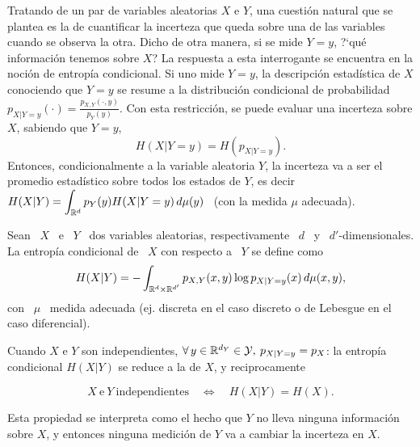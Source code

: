 \label{Sec:SZ:Mutua}

Tratando de un par de variables aleatorias $X$ e $Y$, una cuesti\'on natural que
se  plantea es  la  de cuantificar  la  incerteza  que queda  sobre  una de  las
variables cuando se observa la otra.  Dicho de  otra manera, si se mide $Y = y$,
?`qu\'e informaci\'on  tenemos sobre  $X$? La respuesta  a esta  interrogante se
encuentra en  la noci\'on de  entrop\'ia condicional.  Si uno  mide $Y =  y$, la
descripci\'on  estad\'istica de  $X$  conociendo que  $Y  = y$  se  resume a  la
distribuci\'on      condicional      de      probabilidad      $p_{X|Y=y}(\cdot)
= \frac{p_{X,Y}(\cdot,y)}{p_Y(y)}$.   Con esta  restricci\'on, se  puede evaluar
una incerteza sobre $X$, sabiendo que $Y=y$,
%
\[
H(X|Y=y) = H\left( p_{X|Y=y} \right).
\]
%
Entonces, condicionalmente a la variable aleatoria $Y$, la incerteza va a ser el
promedio estad\'istico sobre  todos los estados de $Y$,  es decir $\displaystyle
H(X|Y)  = \int_{\mathbb{R}^d}  p_Y(y) H(X|Y=y)  \, d\mu(y)$  \ (con  la medida  $\mu$
adecuada).
%
\begin{definicion}
\label{Def:SZ:entropiacondicional}
%
  Sean \ $X$ \  e \ $Y$ \ dos variables aleatorias, respectivamente  \ $d$ \ y \
  $d'$-dimensionales. La entrop\'ia condicional de \ $X$ con respecto a \ $Y$ se
  define como
  \[
  H(X|Y)   =   -  \int_{\mathbb{R}^d   \times   \mathbb{R}^{d'}}  p_{X,Y}(x,y)   \log
  p_{X|Y=y}(x) \, d\mu(x,y),
  \]
  con \ $\mu$ \ medida adecuada (ej.  discreta en el caso discreto o de Lebesgue
  en el caso diferencial).
\end{definicion}

Cuando $X$ e  $Y$ son independientes, $\forall  \, y \in \mathbb{R}^{d_Y}  \in \mathcal{Y}, \:
p_{X|Y=y} = p_X$:  la entrop\'ia condicional $H(X|Y)$  se reduce a la  de $X$, y
reciprocamente
%
\begin{propiedades}
\item\label{Prop:SZ:independenciacondicional}
  \[
  X \: \mbox{e} \: Y \: \mbox{independientes} \quad \Leftrightarrow \quad H(X|Y)
  = H(X).
  \]
\end{propiedades}
%
Esta  propiedad  se   interpreta  como  el  hecho  que   $Y$  no  lleva  ninguna
informaci\'on sobre  $X$, y entonces ninguna  medici\'on de $Y$ va  a cambiar la
incerteza en $X$.

